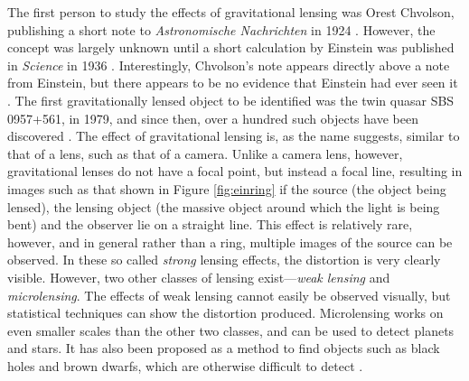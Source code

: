 \documentclass[a4paper,11pt]{article}
\begin{document}
The first person to study the effects of gravitational lensing was Orest
Chvolson, publishing a short note to \emph{Astronomische Nachrichten} in 1924
\cite{chwolsonlensing}. However, the concept was largely unknown until a short
calculation by Einstein was published in \emph{Science} in 1936
\cite{einsteinlensing}. Interestingly, Chvolson's note appears directly above a
note from Einstein\cite{einsteinchwolson}, but there appears to be no evidence that Einstein had ever
seen it \cite{renn2000eclipses}. The first gravitationally
lensed object to be identified was the twin quasar SBS 0957+561, in 1979, and
since then, over a hundred such objects have been discovered
\cite{firstlens,gravlenscount}. The effect of gravitational lensing is, as the
name suggests, similar to that of a lens, such as that of a camera. Unlike a
camera lens, however, gravitational lenses do not have a focal point, but
instead a focal line, resulting in images such as that shown in Figure
\ref{fig:einring} if the source (the object being lensed), the lensing object
(the massive object around which the light is being bent) and the observer lie on a
straight line. This effect is relatively rare, however, and in general rather
than a ring, multiple images of the source can be observed. In these so called
\emph{strong} lensing effects, the distortion is very clearly visible. However,
two other classes of lensing exist---\emph{weak lensing} and
\emph{microlensing}.  The effects of weak lensing cannot easily be observed
visually, but statistical techniques can show the distortion
produced. Microlensing works on even smaller scales than the other two classes,
and can be used to detect planets and stars. It has also been proposed as a
method to find objects such as black holes and brown dwarfs, which are otherwise
difficult to detect \cite{schneider2006gravitational}.
\end{document}
